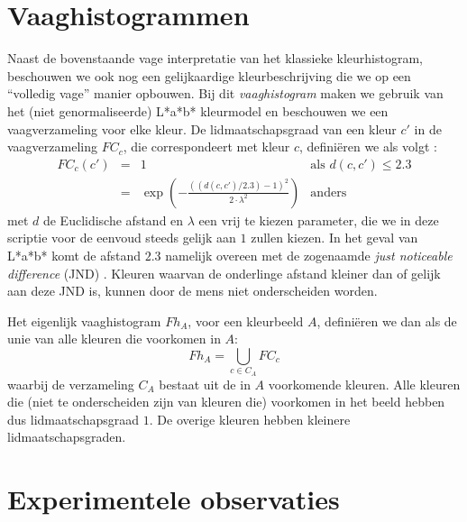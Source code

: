 \section{Vaaghistogrammen}

Naast de bovenstaande vage interpretatie van het klassieke kleurhistogram, 
beschouwen we ook nog een gelijkaardige kleurbeschrijving die we op een 
``volledig vage'' manier opbouwen. Bij dit \emph{vaaghistogram} maken we 
gebruik van het (niet genormaliseerde) L*a*b* kleurmodel en beschouwen we een 
vaagverzameling voor elke kleur. De lidmaatschapsgraad van een kleur $c'$ in de 
vaagverzameling $FC_c$, die correspondeert met kleur $c$, defini\"eren we als 
volgt \cite{vertan:embedding_fuzzy_logic_in_cbir,vertan:fuzzy_histograms}: $$
\begin{array}{rcll}
FC_c(c') & = & 1 & \textrm{als } d(c,c') \leq 2.3 \\ & = & \exp \left( - 
\frac{\left((d(c,c') / 2.3) - 1\right)^2}{2 \cdot \lambda^2} \right) & 
\textrm{anders}
\end{array}
$$ met $d$ de Euclidische afstand en $\lambda$ een vrij te kiezen parameter, 
die we in deze scriptie voor de eenvoud steeds gelijk aan $1$ zullen kiezen. In 
het geval van L*a*b* komt de afstand $2.3$ namelijk overeen met de zogenaamde 
\emph{just noticeable difference} (JND) \cite{sharma:digital_color_imaging}. 
Kleuren waarvan de onderlinge afstand kleiner dan of gelijk aan deze JND is, 
kunnen door de mens niet onderscheiden worden.

Het eigenlijk vaaghistogram $Fh_A$, voor een kleurbeeld $A$, defini\"eren we 
dan als de unie van alle kleuren die voorkomen in $A$: $$ Fh_A = 
\displaystyle\bigcup_{c \in C_A} FC_c
$$ waarbij de verzameling $C_A$ bestaat uit de in $A$ voorkomende kleuren. Alle 
kleuren die (niet te onderscheiden zijn van kleuren die) voorkomen in het beeld 
hebben dus lidmaatschapsgraad $1$. De overige kleuren hebben kleinere 
lidmaatschapsgraden.


\section{Experimentele observaties}


